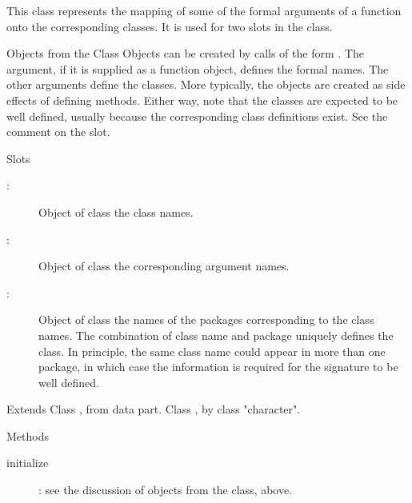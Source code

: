 %
\begin{Description}\relax
This class represents the mapping of some of the formal
arguments of a function onto the corresponding classes.  It is used for
two slots in the  class.
\end{Description}
%
\begin{Section}{Objects from the Class}
Objects can be created by calls of the form .  The  argument, if it is
supplied as a function object, defines the formal names.  The other
arguments define the classes.  More typically, the objects are
created as side effects of defining methods.  Either way, note that
the classes are expected to be well defined, usually because the
corresponding class definitions exist.  See the comment on the
 slot.
\end{Section}
%
\begin{Section}{Slots}
\begin{description}

\item[:] Object of class  the class names. 
\item[:] Object of class  the
corresponding argument names. 
\item[:] Object of class  the
names of the packages corresponding to the class names. The
combination of class name and package uniquely defines the
class.  In principle, the same class name could appear in more
than one package, in which case the  information
is required for the signature to be well defined. 
\end{description}

\end{Section}
%
\begin{Section}{Extends}
Class , from data part.
Class , by class "character".
\end{Section}
%
\begin{Section}{Methods}
\begin{description}

\item[initialize] : see the
discussion of objects from the class, above. 

\end{description}

\end{Section}
